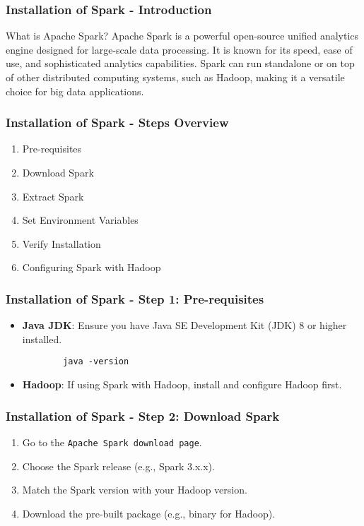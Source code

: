 \documentclass[aspectratio=169]{beamer}
\begin{document}
\begin{frame}[fragile]
    \frametitle{Installation of Spark - Introduction}
    \begin{block}{What is Apache Spark?}
        Apache Spark is a powerful open-source unified analytics engine designed for large-scale data processing. 
        It is known for its speed, ease of use, and sophisticated analytics capabilities.
        Spark can run standalone or on top of other distributed computing systems, 
        such as Hadoop, making it a versatile choice for big data applications.
    \end{block}
\end{frame}

\begin{frame}[fragile]
    \frametitle{Installation of Spark - Steps Overview}
    \begin{enumerate}
        \item Pre-requisites
        \item Download Spark
        \item Extract Spark
        \item Set Environment Variables
        \item Verify Installation
        \item Configuring Spark with Hadoop
    \end{enumerate}
\end{frame}

\begin{frame}[fragile]
    \frametitle{Installation of Spark - Step 1: Pre-requisites}
    \begin{itemize}
        \item \textbf{Java JDK}: 
        Ensure you have Java SE Development Kit (JDK) 8 or higher installed.
        \begin{lstlisting}
        java -version
        \end{lstlisting}
        
        \item \textbf{Hadoop}: 
        If using Spark with Hadoop, install and configure Hadoop first.
    \end{itemize}
\end{frame}

\begin{frame}[fragile]
    \frametitle{Installation of Spark - Step 2: Download Spark}
    \begin{enumerate}
        \item Go to the \texttt{Apache Spark download page}.
        \item Choose the Spark release (e.g., Spark 3.x.x).
        \item Match the Spark version with your Hadoop version.
        \item Download the pre-built package (e.g., binary for Hadoop).
    \end{enumerate}
\end{frame}
\end{document}
